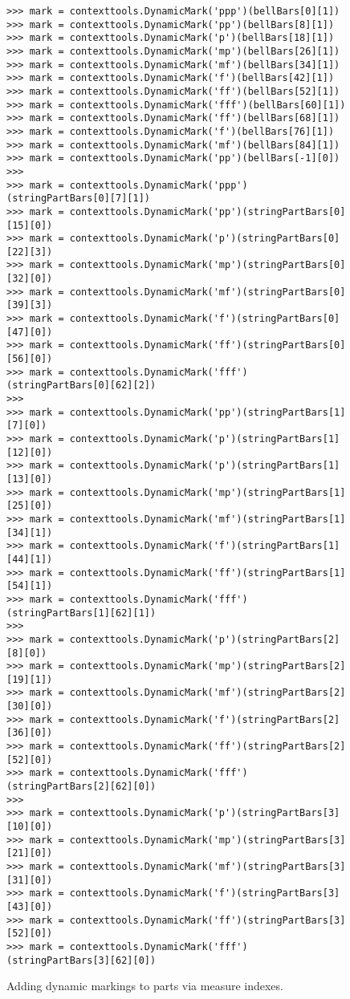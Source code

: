 \begin{figure}[H] 
\begin{lstlisting}[basicstyle=\scriptsize\ttfamily, breaklines=True, tabsize=4, showtabs=false, showspaces=false]
>>> mark = contexttools.DynamicMark('ppp')(bellBars[0][1])
>>> mark = contexttools.DynamicMark('pp')(bellBars[8][1])
>>> mark = contexttools.DynamicMark('p')(bellBars[18][1])
>>> mark = contexttools.DynamicMark('mp')(bellBars[26][1])
>>> mark = contexttools.DynamicMark('mf')(bellBars[34][1])
>>> mark = contexttools.DynamicMark('f')(bellBars[42][1])
>>> mark = contexttools.DynamicMark('ff')(bellBars[52][1])
>>> mark = contexttools.DynamicMark('fff')(bellBars[60][1])
>>> mark = contexttools.DynamicMark('ff')(bellBars[68][1])
>>> mark = contexttools.DynamicMark('f')(bellBars[76][1])
>>> mark = contexttools.DynamicMark('mf')(bellBars[84][1])
>>> mark = contexttools.DynamicMark('pp')(bellBars[-1][0])
>>> 
>>> mark = contexttools.DynamicMark('ppp')(stringPartBars[0][7][1])
>>> mark = contexttools.DynamicMark('pp')(stringPartBars[0][15][0])
>>> mark = contexttools.DynamicMark('p')(stringPartBars[0][22][3])
>>> mark = contexttools.DynamicMark('mp')(stringPartBars[0][32][0])
>>> mark = contexttools.DynamicMark('mf')(stringPartBars[0][39][3])
>>> mark = contexttools.DynamicMark('f')(stringPartBars[0][47][0])
>>> mark = contexttools.DynamicMark('ff')(stringPartBars[0][56][0])
>>> mark = contexttools.DynamicMark('fff')(stringPartBars[0][62][2])
>>> 
>>> mark = contexttools.DynamicMark('pp')(stringPartBars[1][7][0])
>>> mark = contexttools.DynamicMark('p')(stringPartBars[1][12][0])
>>> mark = contexttools.DynamicMark('p')(stringPartBars[1][13][0])
>>> mark = contexttools.DynamicMark('mp')(stringPartBars[1][25][0])
>>> mark = contexttools.DynamicMark('mf')(stringPartBars[1][34][1])
>>> mark = contexttools.DynamicMark('f')(stringPartBars[1][44][1])
>>> mark = contexttools.DynamicMark('ff')(stringPartBars[1][54][1])
>>> mark = contexttools.DynamicMark('fff')(stringPartBars[1][62][1])
>>> 
>>> mark = contexttools.DynamicMark('p')(stringPartBars[2][8][0])
>>> mark = contexttools.DynamicMark('mp')(stringPartBars[2][19][1])
>>> mark = contexttools.DynamicMark('mf')(stringPartBars[2][30][0])
>>> mark = contexttools.DynamicMark('f')(stringPartBars[2][36][0])
>>> mark = contexttools.DynamicMark('ff')(stringPartBars[2][52][0])
>>> mark = contexttools.DynamicMark('fff')(stringPartBars[2][62][0])
>>> 
>>> mark = contexttools.DynamicMark('p')(stringPartBars[3][10][0])
>>> mark = contexttools.DynamicMark('mp')(stringPartBars[3][21][0])
>>> mark = contexttools.DynamicMark('mf')(stringPartBars[3][31][0])
>>> mark = contexttools.DynamicMark('f')(stringPartBars[3][43][0])
>>> mark = contexttools.DynamicMark('ff')(stringPartBars[3][52][0])
>>> mark = contexttools.DynamicMark('fff')(stringPartBars[3][62][0])\end{lstlisting}


\caption{Adding dynamic markings to parts via measure indexes. } 
\end{figure}

